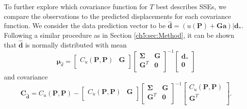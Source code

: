 To further explore which covariance function for $T$ best describes
SSEs, we compare the observations to the predicted displacements for
each covariance function. We consider the data prediction vector to be
$\hat{\mathbf{d}} = \left(u(\mathbf{P}) +
\mathbf{G}\mathbf{a}\right)|\mathbf{d}_*$. Following a similar
procedure as in Section \ref{ch5:sec:Method}, it can be shown that
$\hat{\mathbf{d}}$ is normally distributed with mean
\begin{equation}\label{ch5:eq:DataPredMean}
\mathbf{\mu}_{\hat{d}} = \left[\begin{array}{cc}
                           C_u(\mathbf{P},\mathbf{P}) & \mathbf{G} \\
                           \end{array}\right]
                     \left[\begin{array}{cc}
                           \mathbf{\Sigma} & \mathbf{G} \\
                           \mathbf{G}^T  & \mathbf{0} \\
                           \end{array}\right]^{-1}
                     \left[\begin{array}{c}
                           \mathbf{d}_* \\
                           \mathbf{0} \\
                           \end{array}\right]
\end{equation}  
and covariance
\begin{equation}\label{ch5:eq:DataPredCov}
\mathbf{C}_{\hat{\mathbf{d}}} = C_u(\mathbf{P},\mathbf{P}) - 
                        \left[\begin{array}{cc}
                              C_u(\mathbf{P},\mathbf{P}) & \mathbf{G} \\
                              \end{array}\right]
                        \left[\begin{array}{cc}
                              \mathbf{\Sigma} & \mathbf{G} \\
                              \mathbf{G}^T  & \mathbf{0} \\
                              \end{array}\right]^{-1}
                        \left[\begin{array}{c}
                              C_u(\mathbf{P},\mathbf{P}) \\
                              \mathbf{G}^T \\
                              \end{array}\right].
\end{equation}
